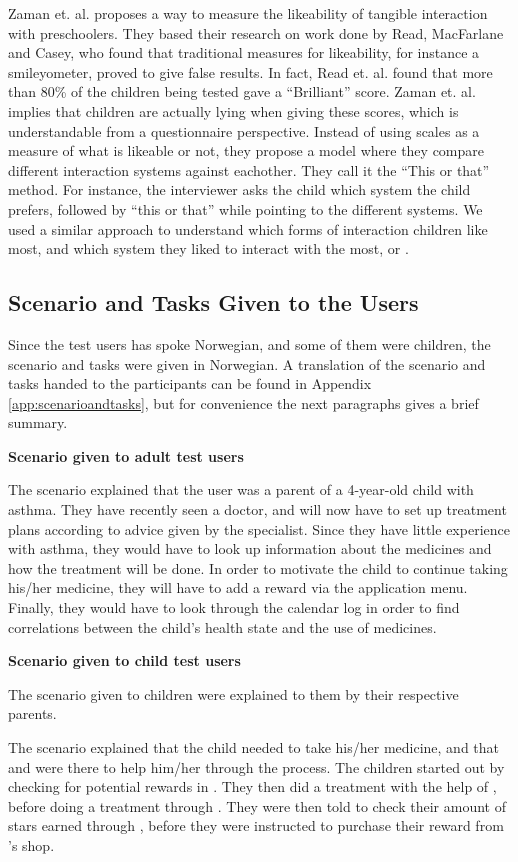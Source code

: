 Zaman et. al. proposes a way to measure the likeability of tangible interaction with preschoolers\cite{zaman2007measure}. They based their research on work done by Read, MacFarlane and Casey\cite{read2002endurability}, who found that traditional measures for likeability, for instance a smileyometer, proved to give false results. In fact, Read et. al. found that more than 80\% of the children being tested gave a ``Brilliant'' score. Zaman et. al. implies that children are actually lying when giving these scores, which is understandable from a questionnaire perspective. Instead of using scales as a measure of what is likeable or not, they propose a model where they compare different interaction systems against eachother. They call it the ``This or that'' method\cite{zaman2007measure}. For instance, the interviewer asks the child which system the child prefers, followed by ``this or that'' while pointing to the different systems. We used a similar approach to understand which forms of interaction children like most, and which system they liked to interact with the most, \app{} or \ab{}.   


\subsection{Scenario and Tasks Given to the Users}
\label{sec:scenarioandtasksgiventotheusers}
Since the test users has spoke Norwegian, and some of them were children, the scenario and tasks were given in Norwegian. A translation of the scenario and tasks handed to the participants can be found in Appendix \ref{app:scenarioandtasks}, but for convenience the next paragraphs gives a brief summary.

\textbf{Scenario given to adult test users}

The scenario explained that the user was a parent of a 4-year-old child with asthma. They have recently seen a doctor, and will now have to set up treatment plans according to advice given by the specialist. Since they have little experience with asthma, they would have to look up information about the medicines and how the treatment will be done. In order to motivate the child to continue taking his/her medicine, they will have to add a reward via the application menu. Finally, they would have to look through the calendar log in order to find correlations between the child's health state and the use of medicines. 


\textbf{Scenario given to child test users}

The scenario given to children were explained to them by their respective parents.

The scenario explained that the child needed to take his/her medicine, and that \app{} and \ab{} were there to help him/her through the process. The children started out by checking for potential rewards in \app{}. They then did a treatment with the help of \ab{}, before doing a treatment through \app{}. They were then told to check their amount of stars earned through \ab{}, before they were instructed to purchase their reward from \app{}'s shop.     
